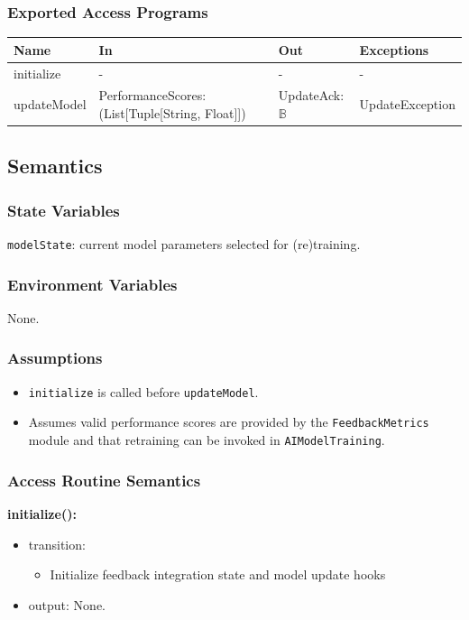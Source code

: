 \documentclass[12pt, titlepage]{article}
\newcommand{\Bool}{\ensuremath{\mathbb{B}}}
\begin{document}
\subsubsection{Exported Access Programs}

\begin{center}
  \begin{tabular}{p{3cm} p{6cm} p{3cm} p{3cm}}
    \hline
    \textbf{Name} & \textbf{In} & \textbf{Out} & \textbf{Exceptions} \\
    \hline
    initialize & - & - & - \\
    \hline
    updateModel & PerformanceScores: (List[Tuple[String, Float]]) & UpdateAck:\Bool & UpdateException \\
    \hline
  \end{tabular}
\end{center}

\subsection{Semantics}

\subsubsection{State Variables}
\texttt{modelState}: current model parameters selected for (re)training.

\subsubsection{Environment Variables}
None.

\subsubsection{Assumptions}
\begin{itemize}
  \item \texttt{initialize} is called before \texttt{updateModel}.
  \item Assumes valid performance scores are provided by the \texttt{FeedbackMetrics} module and that retraining 
  can be invoked in \texttt{AIModelTraining}.

\end{itemize}

\subsubsection{Access Routine Semantics}
\noindent \textbf{initialize():}
\begin{itemize}
  \item transition:
  \begin{itemize}
    \item Initialize feedback integration state and model update hooks
  \end{itemize}
  \item output: None.
\end{itemize}
\end{document}
